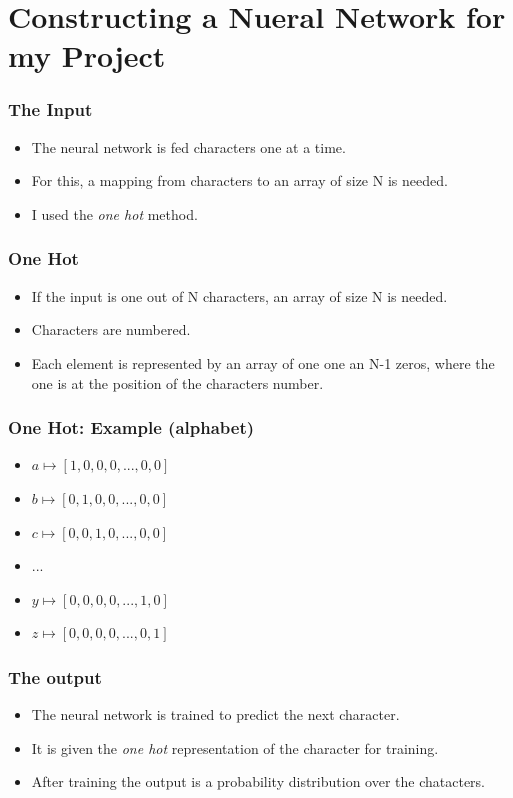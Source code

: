 \documentclass[12]{beamer}
\begin{document}
\section{Constructing a Nueral Network for my Project}
\begin{frame}
\frametitle{The Input}
\begin{itemize}
\item<1-> The neural network is fed characters one at a time.
\item<1-> For this, a mapping from characters to an array of size N is needed.
\item<1-> I used the \textit{one hot} method.
\end{itemize}
\end{frame}

\begin{frame}
\frametitle{One Hot}
\begin{itemize}
\item<1-> If the input is one out of N characters, an array of size N is needed.
\item<1-> Characters are numbered.
\item<1-> Each element is represented by an array of one one an N-1 zeros, where the one is at the position of the characters number.
\end{itemize}
\end{frame}

\begin{frame}
\frametitle{One Hot: Example (alphabet)}
\begin{itemize}
\item<1-> $a \longmapsto [1,0,0,0,...,0,0]$
\item<1-> $b \longmapsto [0,1,0,0,...,0,0]$
\item<1-> $c \longmapsto [0,0,1,0,...,0,0]$
\item<1-> $...$
\item<1-> $y \longmapsto [0,0,0,0,...,1,0]$
\item<1-> $z \longmapsto [0,0,0,0,...,0,1]$
\end{itemize}
\end{frame}

\begin{frame}
\frametitle{The output}
\begin{itemize}
\item<1-> The neural network is trained to predict the next character.
\item<1-> It is given the \textit{one hot} representation of the character for training.
\item<1-> After training the output is a probability distribution over the chatacters.
\end{itemize}
\end{frame}
\end{document}
